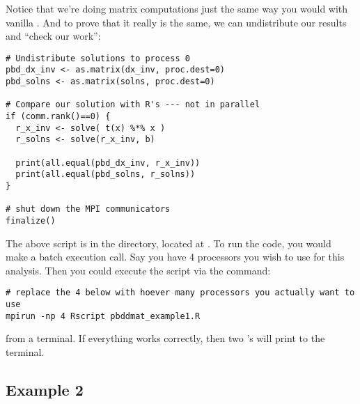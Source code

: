 Notice that we're doing matrix computations just the same way you would with vanilla .  And to prove that it really is the same, we can undistribute our results and ``check our work'':

\begin{lstlisting}[language=rr,title=Comparing Results to \proglang{R}]
# Undistribute solutions to process 0
pbd_dx_inv <- as.matrix(dx_inv, proc.dest=0)
pbd_solns <- as.matrix(solns, proc.dest=0)

# Compare our solution with R's --- not in parallel
if (comm.rank()==0) {
  r_x_inv <- solve( t(x) %*% x )
  r_solns <- solve(r_x_inv, b)
  
  print(all.equal(pbd_dx_inv, r_x_inv))
  print(all.equal(pbd_solns, r_solns))
}

# shut down the MPI communicators
finalize()
\end{lstlisting}

The above script is in the  directory, located at .  To run the code, you would make a batch execution call.  Say you have 4 processors you wish to use for this analysis.  Then you could execute the script via the command:

\begin{lstlisting}
# replace the 4 below with hoever many processors you actually want to use
mpirun -np 4 Rscript pbddmat_example1.R
\end{lstlisting}

from a terminal.  If everything works correctly, then two 's will print to the terminal.



















\subsection[]{Example 2}

